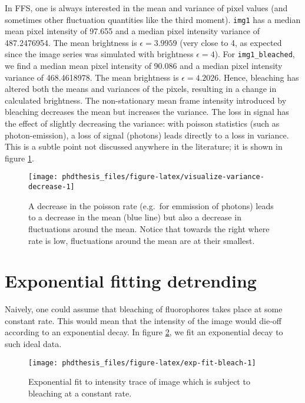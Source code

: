 \documentclass[12pt,]{book}
\theoremstyle{definition}
\theoremstyle{definition}
\theoremstyle{definition}
\theoremstyle{remark}
\begin{document}
In FFS, one is always interested in the mean and variance of pixel
values (and sometimes other fluctuation quantities like the third
moment). \texttt{img1} has a median mean pixel intensity of 97.655 and a
median pixel intensity variance of 487.2476954. The mean brightness is
\(\epsilon = 3.9959\) (very close to 4, as expected since the image
series was simulated with brightness \(\epsilon = 4\)). For
\texttt{img1\_bleached}, we find a median mean pixel intensity of 90.086
and a median pixel intensity variance of 468.4618978. The mean
brightness is \(\epsilon = 4.2026\). Hence, bleaching has altered both
the means and variances of the pixels, resulting in a change in
calculated brightness. The non-stationary mean frame intensity
introduced by bleaching decreases the mean but increases the variance.
The loss in signal has the effect of slightly decreasing the variance:
with poisson statistics (such as photon-emission), a loss of signal
(photons) leads directly to a loss in variance. This is a subtle point
not discussed anywhere in the literature; it is shown in figure
\ref{fig:visualize-variance-decrease}.







\begin{figure}

\texttt{[image: phdthesis\_files/figure-latex/visualize-variance-decrease-1]} \hfill{}

\caption{A decrease in the poisson rate
(e.g.~for emmission of photons) leads to a decrease in the mean (blue
line) but also a decrease in fluctuations around the mean. Notice that
towards the right where rate is low, fluctuations around the mean are at
their smallest.}\label{fig:visualize-variance-decrease}
\end{figure}

\section{Exponential fitting
detrending}\label{exponential-fitting-detrending}

Naively, one could assume that bleaching of fluorophores takes place at
some constant rate. This would mean that the intensity of the image
would die-off according to an exponential decay. In figure
\ref{fig:exp-fit-bleach}, we fit an exponential decay to such ideal
data.




\begin{figure}

\texttt{[image: phdthesis\_files/figure-latex/exp-fit-bleach-1]} \hfill{}

\caption{Exponential fit to intensity trace of image
which is subject to bleaching at a constant rate.}\label{fig:exp-fit-bleach}
\end{figure}
\end{document}
